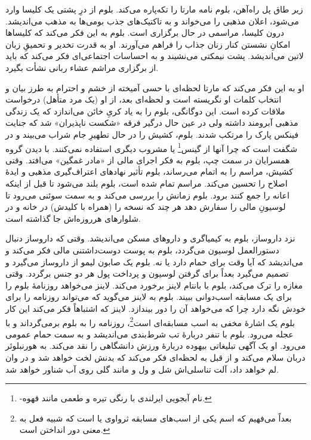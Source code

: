 \documentclass[12pt]{book}
\begin{document}
    زیر طاق پل راه‌آهن، بلوم نامه مارتا را تکه‌پاره می‌کند. بلوم از درِ پشتی یک کلیسا وارد می‌شود، اعلان مذهبی را می‌خواند و به تاکتیک‌های جذب بومی‌ها به مذهب می‌اندیشد. درون کلیسا، مراسمی  در حال برگزاری است. بلوم به این فکر می‌کند که کلیساها امکانِ نشستن کنار زنان جذاب را فراهم می‌آورند. او به قدرت تخدیر و تحمیقِ زبان لاتین می‌اندیشد. پشت نیمکتی می‌نشیند و به احساسات اجتماعی‌ای فکر می‌کند که باید از برگزاری مراشم عشاء ربانی نشأت بگیرد.

    او به این فکر می‌کند که مارتا لحظه‌ای با حسی آمیخته از خشم و احترام به طرز بیان و انتخاب کلمات او نگریسته است و لحظه‌ای بعد، از او (یک مرد متأهل) درخواست ملاقات کرده است. این دوگانگی، بلوم را به یاد کریِ خائن می‌اندازد که یک زندگی مذهبی آبرومند داشته ولی در عین حال درگیر فرقه «شکست ناپذیران» شد که جنایت فینکس پارک را مرتکب شدند. بلوم، کشیش را در حال تطهیرِ جام شراب می‌بیند و در شگفت است که چرا آنها از گینس\footnote{-نام آبجویی ایرلندی با رنگی تیره و طعمی مانند قهوه.} یا مشروب دیگری استفاده نمی‌کنند. با دیدن گروه همسرایان در سمت چپ، بلوم به فکر اجرای مالی از «مادر غمگین» می‌افتد. وقتی کشیش، مراسم را به اتمام می‌رساند، بلوم تأثیر نهادهای اعتراف‌گیری مذهبی و ایدۀ اصلاح را تحسین می‌کند. مراسم تمام شده است، بلوم بلند می‌شود تا قبل از اینکه اعانه را جمع کنند برود. بلوم زمانش را بررسی می‌کند و به سمت سوئنی می‌رود تا لوسیونِ مالی را سفارش دهد هر چند که نسخه را (همراه با کلیدش) در خانه و در شلوارهای هرروزه‌اش جا گذاشته است.

    نزد داروساز، بلوم به کیمیاگری و داروهای مسکن می‌اندیشد. وقتی که داروساز دنبال دستورالعمل لوسیون می‌گردد، بلوم به پوست دوست‌داشتنی مالی فکر می‌کند و می‌اندیشد که آیا وقت برای حمام دارد یا نه. بلوم یک صابون لیمو از داروساز می‌گیرد و تصمیم می‌گیرد بعداً برای گرفتن لوسیون و پرداخت پول هر دو جنس برگردد. وقتی مغازه را ترک می‌کند، بلوم با بانتام لاینز برخورد می‌کند. لاینز می‌خواهد روزنامۀ بلوم را برای یک مسابقه اسب‌دوانی ببیند. بلوم به لاینز می‌گوید که می‌تواند روزنامه را برای خودش نگه دارد چرا که می‌خواهد آن را دور بیندازد. لاینز که اشتباهاً فکر می‌کند این کار بلوم یک اشارۀ مخفی به اسب مسابقه‌ای است\footnote{بعداً می‌فهیم که اسم یکی از اسب‌های مسابقه ثرواوی یا  است که شبیه فعل  به معنی دور انداختن است.}، روزنامه را به بلوم برمی‌گرداند و با عجله می‌رود. بلوم با تنفر دربارۀ تب شرط‌بندی می‌اندیشد و به سمت حمام عمومی می‌رود. او یک آگهی تبلیغاتی بیهوده دربارۀ ورزش دانشگاهی را نقد می‌کند. به هورنبلوئر دربان سلام می‌کند و از قبل به لحظه‌ای فکر می‌کند که بدنش لخت خواهد شد و در وان لم خواهد داد، آلت تناسلی‌اش شل و ول و مانند گلی روی آب شناور خواهد شد.
\end{document}
